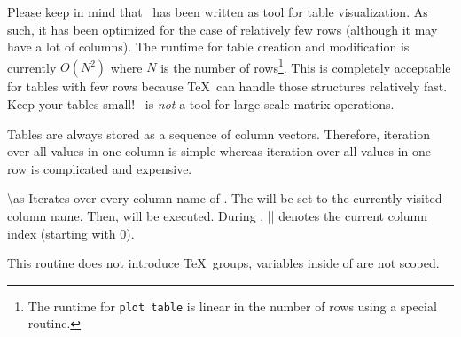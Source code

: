 Please keep in mind that \PGFPlotstable\ has been written as tool for table visualization. As such, it has been optimized for the case of relatively few rows (although it may have a lot of columns). The runtime for table creation and modification is currently $O(N^2)$ where $N$ is the number of rows\footnote{The runtime for \texttt{plot table} is linear in the number of rows using a special routine.}. This is completely acceptable for tables with few rows because \TeX\ can handle those structures relatively fast. Keep your tables small! \PGFPlotstable\ is \emph{not} a tool for large-scale matrix operations.

Tables are always stored as a sequence of column vectors. Therefore, iteration over all values in one column is simple whereas iteration over all values in one row is complicated and expensive.

\begin{command}{\pgfplotstableforeachcolumn{}\textbackslash as}
	Iterates over every column name of . The  will be set to the currently visited column name. Then,  will be executed. During , |\pgfplotstablecol| denotes the current column index (starting with 0).
\begin{codeexample}[]
\begin{minipage}{0.8\linewidth}
\table
\pgfplotstableforeachcolumn\table\as{}
\end{minipage}
\end{codeexample}

	This routine does not introduce \TeX\ groups, variables inside of  are not scoped.
\end{command}


